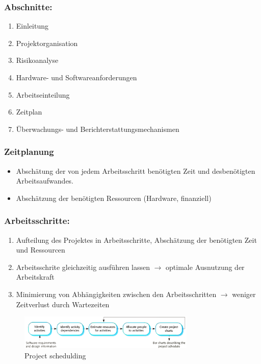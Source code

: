 \subsubsection{Abschnitte:}
\begin{enumerate}
    \item Einleitung 
    \item Projektorganisation
    \item Risikoanalyse
    \item Hardware- und Softwareanforderungen
    \item Arbeitseinteilung
    \item Zeitplan 
    \item Überwachungs- und Berichterstattungsmechanismen
\end{enumerate}

\subsubsection{Zeitplanung}
\begin{itemize}
    \item Abschätung der von jedem Arbeitsschritt benötigten Zeit und desbenötigten Arbeitsaufwandes.
    \item Abschätzung der benötigten Ressourcen (Hardware, finanziell)
\end{itemize}

\subsubsection{Arbeitsschritte:}
\begin{enumerate}
    \item Aufteilung des Projektes in Arbeitsschritte, Abschätzung der benötigten Zeit und Ressourcen
    \item Arbeitsschrite gleichzeitig ausführen lassen $\rightarrow$ optimale Ausnutzung der Arbeitskraft
    \item Minimierung von Abhängigkeiten zwischen den Arbeitsschritten $\rightarrow$ weniger Zeitverlust durch Wartezeiten
\end{enumerate}

\begin{figure}[h]
    \centering
    \includegraphics[width=0.75\textwidth]{mainmatter/pics/project_shedulding.png}
    \caption{Project schedulding}
\end{figure}


